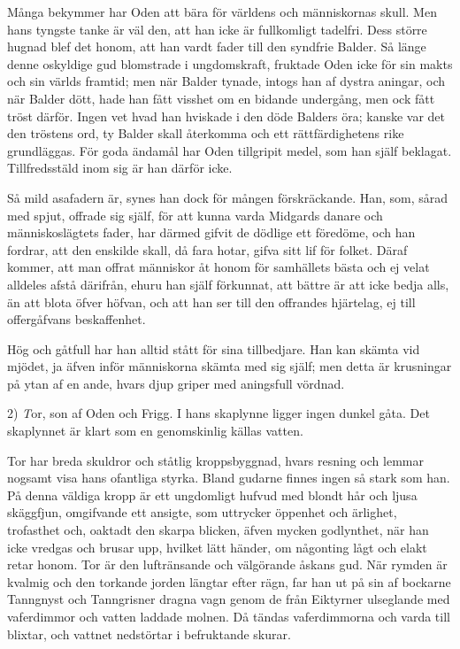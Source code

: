 Många bekymmer har Oden att bära för världens och människornas skull.
Men hans tyngste tanke är väl den, att han icke är fullkomligt tadelfri.
Dess större hugnad blef det honom, att han vardt fader till den syndfrie
Balder. Så länge denne oskyldige gud blomstrade i ungdomskraft, fruktade
Oden icke för sin makts och sin världs framtid; men när Balder tynade,
intogs han af dystra aningar, och när Balder dött, hade han fått visshet
om en bidande undergång, men ock fått tröst därför. Ingen vet hvad han
hviskade i den döde Balders öra; kanske var det den tröstens ord, ty
Balder skall återkomma och ett rättfärdighetens rike grundläggas. För
goda ändamål har Oden tillgripit medel, som han själf beklagat.
Tillfredsstäld inom sig är han därför icke.

Så mild asafadern är, synes han dock för mången förskräckande. Han, som,
sårad med spjut, offrade sig själf, för att kunna varda Midgards danare
och människoslägtets fader, har därmed gifvit de dödlige ett föredöme,
och han fordrar, att den enskilde skall, då fara hotar, gifva sitt lif
för folket. Däraf kommer, att man offrat människor åt honom för
samhällets bästa och ej velat alldeles afstå därifrån, ehuru han själf
förkunnat, att bättre är att icke bedja alls, än att blota öfver höfvan,
och att han ser till den offrandes hjärtelag, ej till offergåfvans
beskaffenhet.

Hög och gåtfull har han alltid stått för sina tillbedjare. Han kan
skämta vid mjödet, ja äfven inför människorna skämta med sig själf; men
detta är krusningar på ytan af en ande, hvars djup griper med aningsfull
vördnad.

2) {\emph Tor}, son af Oden och Frigg. I hans skaplynne ligger ingen
dunkel gåta. Det skaplynnet är klart som en genomskinlig källas vatten.

Tor har breda skuldror och ståtlig kroppsbyggnad, hvars resning och
lemmar nogsamt visa hans ofantliga styrka. Bland gudarne finnes ingen så
stark som han. På denna väldiga kropp är ett ungdomligt hufvud med
blondt hår och ljusa skäggfjun, omgifvande ett ansigte, som uttrycker
öppenhet och ärlighet, trofasthet och, oaktadt den skarpa blicken, äfven
mycken godlynthet, när han icke vredgas och brusar upp, hvilket lätt
händer, om någonting lågt och elakt retar honom. Tor är den luftränsande
och välgörande åskans gud. När rymden är kvalmig och den torkande jorden
längtar efter rägn, far han ut på sin af bockarne Tanngnyst och
Tanngrisner dragna vagn genom de från Eiktyrner ulseglande med
vaferdimmor och vatten laddade molnen. Då tändas vaferdimmorna och varda
till blixtar, och vattnet nedstörtar i befruktande skurar.

